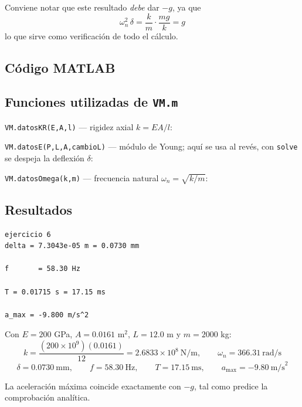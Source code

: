 \documentclass[12pt,letterpaper]{article}
\begin{document}
Conviene notar que este resultado \emph{debe} dar $-g$, ya que
\begin{equation}
\omega_n^{2}\,\delta = \frac{k}{m}\cdot\frac{m g}{k} = g
\end{equation}
lo que sirve como verificación de todo el cálculo.

\subsection{Código MATLAB}


\subsection{Funciones utilizadas de \texttt{VM.m}}

\noindent\texttt{VM.datosKR(E,A,l)} --- rigidez axial $k = EA/l$:


\noindent\texttt{VM.datosE(P,L,A,cambioL)} --- módulo de Young; aquí se usa al revés,
con \texttt{solve} se despeja la deflexión $\delta$:


\noindent\texttt{VM.datosOmega(k,m)} --- frecuencia natural $\omega_n = \sqrt{k/m}$:


\subsection{Resultados}
\begin{lstlisting}[style=consola]
ejercicio 6
delta = 7.3043e-05 m = 0.0730 mm

f       = 58.30 Hz

T = 0.01715 s = 17.15 ms

a_max = -9.800 m/s^2
\end{lstlisting}

\noindent Con $E = 200$ GPa, $A = 0.0161$ m$^2$, $L = 12.0$ m y $m = 2000$ kg:
\[
k = \frac{(200\times10^{9})(0.0161)}{12} = 2.6833\times10^{8}\ \text{N/m},
\qquad \omega_n = 366.31\ \text{rad/s}
\]
\[
\delta = 0.0730\ \text{mm}, \qquad
f = 58.30\ \text{Hz}, \qquad
T = 17.15\ \text{ms}, \qquad
a_{\max} = -9.80\ \text{m/s}^2
\]

\noindent La aceleración máxima coincide exactamente con $-g$, tal como predice la
comprobación analítica.

\newpage
\end{document}
